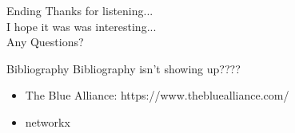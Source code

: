 \documentclass[10pt]{beamer}
\begin{document}
\begin{frame}{Ending}
	Thanks for listening...\\
	I hope it was was interesting...\\
	Any Questions?
\end{frame}


\begin{frame}[allowframebreaks]{Bibliography}
	Bibliography isn't showing up????
	\begin{itemize}
		\item The Blue Alliance: https://www.thebluealliance.com/
		\item networkx
	\end{itemize}
	
	
\end{frame}
\end{document}
